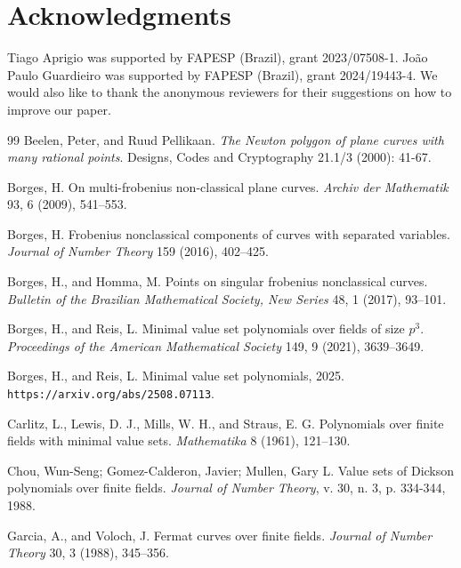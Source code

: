 \documentclass[preprint,12pt]{elsarticle}
\begin{document}
\section{Acknowledgments}
\noindent Tiago Aprigio was supported by FAPESP (Brazil), grant 2023/07508-1. João Paulo Guardieiro was supported by FAPESP (Brazil), grant 2024/19443-4. We would also like to thank the anonymous reviewers for their suggestions on how to improve our paper.

\begin{thebibliography}{99}
Beelen, Peter, and Ruud Pellikaan. \textit{The Newton polygon of plane curves with many rational points}. Designs, Codes and Cryptography 21.1/3 (2000): 41-67.

Borges, H. On multi-frobenius non-classical plane curves. 
\textit{Archiv der Mathematik} 93, 6 (2009), 541--553.

Borges, H. Frobenius nonclassical components of curves with separated variables. 
\textit{Journal of Number Theory} 159 (2016), 402--425.


Borges, H., and Homma, M. Points on singular frobenius nonclassical curves. 
\textit{Bulletin of the Brazilian Mathematical Society, New Series} 48, 1 (2017), 93--101.

Borges, H., and Reis, L. Minimal value set polynomials over fields of size $p^3$. 
\textit{Proceedings of the American Mathematical Society} 149, 9 (2021), 3639--3649.

Borges, H., and Reis, L. Minimal value set polynomials, 2025. 
\texttt{https://arxiv.org/abs/2508.07113}.

Carlitz, L., Lewis, D. J., Mills, W. H., and Straus, E. G. Polynomials over finite fields with minimal value sets. 
\textit{Mathematika} 8 (1961), 121--130.

Chou, Wun-Seng; Gomez-Calderon, Javier; Mullen, Gary L. Value sets of Dickson polynomials over finite fields. \textit{Journal of Number Theory}, v. 30, n. 3, p. 334-344, 1988.

Garcia, A., and Voloch, J. Fermat curves over finite fields. 
\textit{Journal of Number Theory} 30, 3 (1988), 345--356.


\end{thebibliography}
\end{document}
